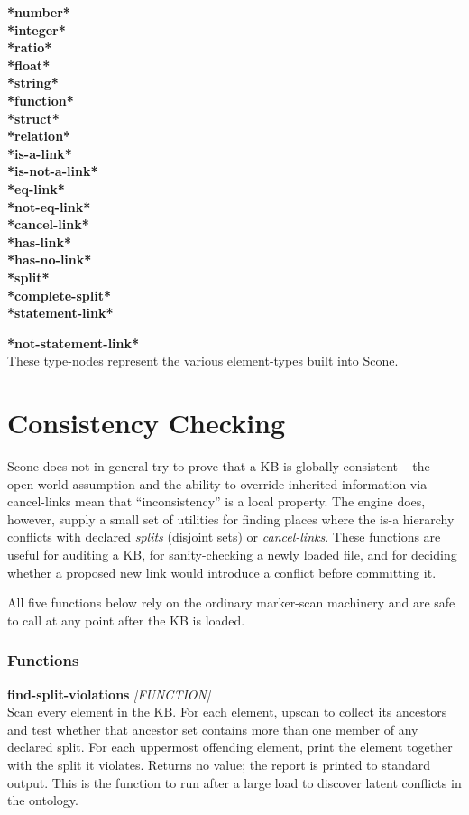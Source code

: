\documentclass[titlepage,twoside,openright,11pt]{article}
\begin{document}
\textbf{*number*\\
*integer*\\
*ratio*\\
*float*\\
*string*\\
*function*\\
*struct*\\
*relation*\\
*is-a-link*\\
*is-not-a-link*\\
*eq-link*\\
*not-eq-link*\\
*cancel-link*\\
*has-link*\\
*has-no-link*\\
*split*\\
*complete-split*\\
*statement-link*}

\textbf{*not-statement-link*\\
}These type-nodes represent the various element-types built into Scone.

\section{Consistency Checking}\label{consistency-checking}

Scone does not in general try to prove that a KB is globally
consistent -- the open-world assumption and the ability to override
inherited information via cancel-links mean that ``inconsistency'' is
a local property. The engine does, however, supply a small set of
utilities for finding places where the is-a hierarchy conflicts with
declared \emph{splits} (disjoint sets) or \emph{cancel-links}. These
functions are useful for auditing a KB, for sanity-checking a newly
loaded file, and for deciding whether a proposed new link would
introduce a conflict before committing it.

All five functions below rely on the ordinary marker-scan machinery
and are safe to call at any point after the KB is loaded.

\subsubsection{Functions}\label{functions-consistency}

\textbf{find-split-violations} \emph{{[}FUNCTION{]}}\\
Scan every element in the KB. For each element, upscan to collect its
ancestors and test whether that ancestor set contains more than one
member of any declared split. For each uppermost offending element,
print the element together with the split it violates. Returns no
value; the report is printed to standard output. This is the function
to run after a large load to discover latent conflicts in the
ontology.
\end{document}
